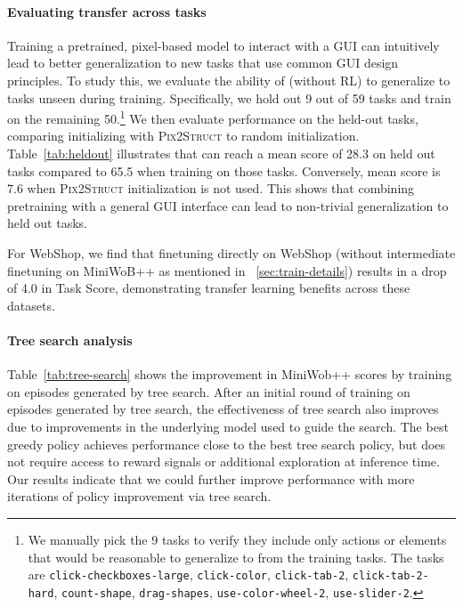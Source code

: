\paragraph{Evaluating transfer across tasks}
Training a pretrained, pixel-based model to interact with a GUI can intuitively lead to better generalization to new tasks that use common GUI design principles. To study this, we evaluate the ability of \ours{} (without RL) to generalize to tasks unseen during training. Specifically, we hold out 9 out of 59 tasks and train on the remaining 50.\footnote{We manually pick the 9 tasks to verify they include only actions or elements that would be reasonable to generalize to from the training tasks. The tasks are \texttt{click-checkboxes-large}, \texttt{click-color}, \texttt{click-tab-2}, \texttt{click-tab-2-hard}, \texttt{count-shape}, \texttt{drag-shapes}, \texttt{use-color-wheel-2}, \texttt{use-slider-2}.}  We then evaluate performance on the held-out tasks, comparing initializing with \textsc{Pix2Struct} to random initialization.
Table~\ref{tab:heldout} illustrates that \ours{} can reach a mean score of 28.3 on held out tasks compared to 65.5 when training on those tasks. Conversely, mean score is 7.6 when \textsc{Pix2Struct} initialization is not used. This shows that combining pretraining with a general GUI interface can lead to non-trivial generalization to held out tasks.



For WebShop, we find that finetuning directly on WebShop (without intermediate finetuning on MiniWoB++ as mentioned in ~\ref{sec:train-details}) results in a drop of 4.0 in Task Score, demonstrating transfer learning benefits across these datasets.

\paragraph{Tree search analysis} Table~\ref{tab:tree-search} shows the improvement in MiniWob++ scores by training on episodes generated by tree search. After an initial round of training on episodes generated by tree search, the effectiveness of tree search also improves due to improvements in the underlying model used to guide the search. The best greedy policy achieves performance close to the best tree search policy, but does not require access to reward signals or additional exploration at inference time. Our results indicate that we could further improve performance with more iterations of policy improvement via tree search.
